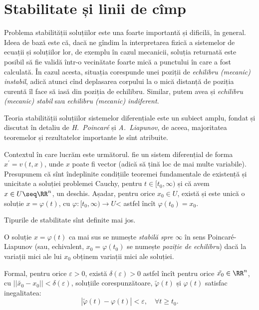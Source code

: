 \chapter{Stabilitate și linii de cîmp}

\indent\indent Problema stabilității soluțiilor este una foarte importantă și dificilă,
în general. Ideea de bază este că, dacă ne gîndim la interpretarea fizică
a sistemelor de ecuații și soluțiilor lor, de exemplu în cazul mecanicii,
soluția returnată este posibil să fie validă într-o vecinătate foarte mică
a punctului în care a fost calculată. În cazul acesta, situația corespunde
unei poziții de \textit{echilibru (mecanic) instabil}, adică atunci cînd
deplasarea corpului la o mică distanță de poziția curentă îl face să iasă
din poziția de echilibru. Similar, putem avea și \textit{echilibru (mecanic) stabil}
sau \textit{echilibru (mecanic) indiferent}.

Teoria stabilității soluțiilor sistemelor diferențiale este un subiect amplu,
fondat și discutat în detaliu de \textit{H.\ Poincar\'e} și \textit{A.\ Liapunov},
de aceea, majoritatea teoremelor și rezultatelor importante le sînt atribuite.

Contextul în care lucrăm este următorul. fie un sistem diferențial de forma
$ x^\prime = v(t, x) $, unde $ x $ poate fi vector (adică să țină loc de mai
multe variabile). Presupunem că sînt îndeplinite condițiile teoremei fundamentale
de existență și unicitate a soluției problemei Cauchy, pentru $ t \in [t_0, \infty) $
și că avem $ x \in U \seq \RR^n $, un deschis. Așadar, pentru orice $ x_0 \in U $,
există și este unică o soluție $ x = \varphi(t) $, cu $ \varphi : [t_0, \infty) \to U $<
astfel încît $ \varphi(t_0) = x_0 $.

Tipurile de stabilitate sînt definite mai jos.

\begin{definition}\label{def:stabil-inf}
  O soluție $ x = \varphi(t) $ ca mai sus se numește \emph{stabilă spre $\infty$}
  în sens Poincar\'e-Lia\-pu\-nov (sau, echivalent, $ x_0 = \varphi(t_0) $
  se numește \emph{poziție de echilibru}) dacă la variații mici ale
  lui $ x_0 $ ob\-ți\-nem variații mici ale soluției.

  Formal, pentru orice $ \varepsilon > 0 $, există $ \delta(\varepsilon) > 0 $
  astfel încît pentru orice $ \tilde{x_0} \in \RR^n $, cu
  $ ||\tilde{x_0} - x_0 || < \delta(\varepsilon) $, soluțiile corespunzătoare,
  $ \tilde{\varphi}(t) $ și $ \varphi(t) $ satisfac inegalitatea:
  \[
    | \tilde{\varphi}(t) - \varphi(t) | < \varepsilon, \quad \forall t \geq t_0.
  \]
\end{definition}

